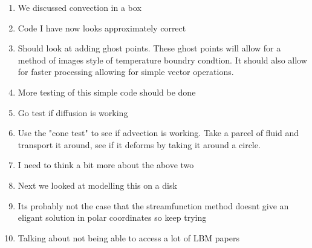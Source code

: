 \documentclass{article}
\begin{document}
\begin{enumerate}
	\item We discussed convection in a box
	\item Code I have now looks approximately correct
	\item Should look at adding ghost points. These ghost points will allow for a method of images style of temperature boundry condtion. It should also allow for faster processing allowing for simple vector operations.
	\item More testing of this simple code should be done
	\item Go test if diffusion is working
	\item Use the "cone test" to see if advection is working. Take a parcel of fluid and transport it around, see if it deforms by taking it around a circle.
	\item I need to think a bit more about the above two
	\item Next we looked at modelling this on a disk
	\item Its probably not the case that the streamfunction method doesnt give an eligant solution in polar coordinates so keep trying
	\item Talking about not being able to access a lot of LBM papers
\end{enumerate}

\newpage
\end{document}
